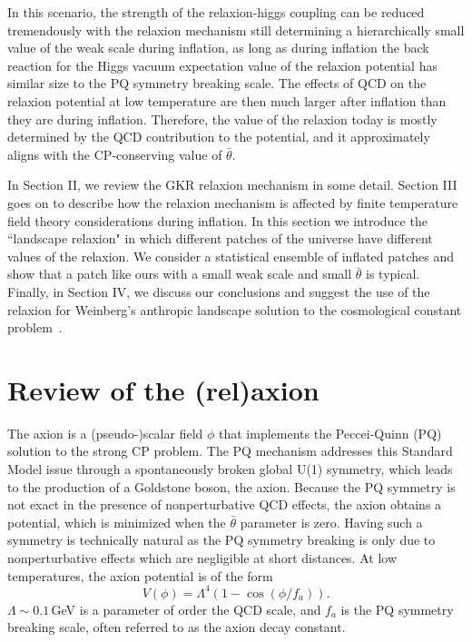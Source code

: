 \documentclass[12pt,aps,prd,showpacs,notitlepage,nofootinbib]{revtex4-1}
\newcommand{\beq}{\begin{equation}}
\newcommand{\eeq}{\end{equation}}
\begin{document}
In this scenario, the strength of the relaxion-higgs coupling can be reduced tremendously with the relaxion mechanism still determining a hierarchically small value of the weak scale during inflation, as long as during inflation the back reaction for the Higgs vacuum expectation value of the relaxion potential has similar size to the PQ symmetry breaking scale. The effects of QCD on the relaxion potential at low temperature are then much larger after inflation than they are during inflation. Therefore, the value of the relaxion today is mostly determined by the QCD contribution to the potential, and it approximately aligns with the CP-conserving value of $\bar{\theta}$.

In Section II, we review the GKR relaxion mechanism in some detail. Section III goes on to describe how the relaxion mechanism is affected by finite temperature field theory considerations during inflation. In this section we introduce the ``landscape relaxion" in which different patches of the universe have different values of the relaxion.  We consider a statistical ensemble of inflated patches and show that a patch like ours with a small weak scale and small $\bar{\theta}$ is typical. Finally, in Section IV, we discuss our conclusions and suggest the use of the relaxion for Weinberg's anthropic landscape solution to the cosmological constant problem~\cite{Weinberg:1987dv}.

\section{Review of the (rel)axion}

The axion is a (pseudo-)scalar field $\phi$ that implements the Peccei-Quinn  (PQ) solution to the strong CP problem. The PQ mechanism addresses this Standard Model issue through a spontaneously broken global U(1) symmetry, which leads to the production of a Goldstone boson, the axion. Because the  PQ symmetry is not exact in the presence of nonperturbative QCD effects, the axion obtains a potential, which is minimized when the $\bar\theta$ parameter is zero. Having such a symmetry is technically natural as the PQ symmetry breaking is only due to nonperturbative effects which are negligible at short distances. At low temperatures, the axion potential is  of the form
\beq
V(\phi)=\Lambda^4\left(1-\cos\left(\phi/f_a\right)\right).
\eeq
 $\Lambda \sim 0.1$\,GeV is a parameter of order the QCD scale, and $f_a$ is the PQ symmetry breaking scale, often referred to as the axion decay constant. 
 
\end{document}
